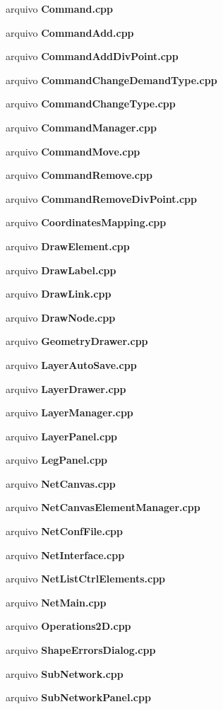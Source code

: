 \begin{DoxyCompactItemize}
\item 
arquivo {\bf Command.\+cpp}
\item 
arquivo {\bf Command\+Add.\+cpp}
\item 
arquivo {\bf Command\+Add\+Div\+Point.\+cpp}
\item 
arquivo {\bf Command\+Change\+Demand\+Type.\+cpp}
\item 
arquivo {\bf Command\+Change\+Type.\+cpp}
\item 
arquivo {\bf Command\+Manager.\+cpp}
\item 
arquivo {\bf Command\+Move.\+cpp}
\item 
arquivo {\bf Command\+Remove.\+cpp}
\item 
arquivo {\bf Command\+Remove\+Div\+Point.\+cpp}
\item 
arquivo {\bf Coordinates\+Mapping.\+cpp}
\item 
arquivo {\bf Draw\+Element.\+cpp}
\item 
arquivo {\bf Draw\+Label.\+cpp}
\item 
arquivo {\bf Draw\+Link.\+cpp}
\item 
arquivo {\bf Draw\+Node.\+cpp}
\item 
arquivo {\bf Geometry\+Drawer.\+cpp}
\item 
arquivo {\bf Layer\+Auto\+Save.\+cpp}
\item 
arquivo {\bf Layer\+Drawer.\+cpp}
\item 
arquivo {\bf Layer\+Manager.\+cpp}
\item 
arquivo {\bf Layer\+Panel.\+cpp}
\item 
arquivo {\bf Leg\+Panel.\+cpp}
\item 
arquivo {\bf Net\+Canvas.\+cpp}
\item 
arquivo {\bf Net\+Canvas\+Element\+Manager.\+cpp}
\item 
arquivo {\bf Net\+Conf\+File.\+cpp}
\item 
arquivo {\bf Net\+Interface.\+cpp}
\item 
arquivo {\bf Net\+List\+Ctrl\+Elements.\+cpp}
\item 
arquivo {\bf Net\+Main.\+cpp}
\item 
arquivo {\bf Operations2\+D.\+cpp}
\item 
arquivo {\bf Shape\+Errors\+Dialog.\+cpp}
\item 
arquivo {\bf Sub\+Network.\+cpp}
\item 
arquivo {\bf Sub\+Network\+Panel.\+cpp}
\end{DoxyCompactItemize}
